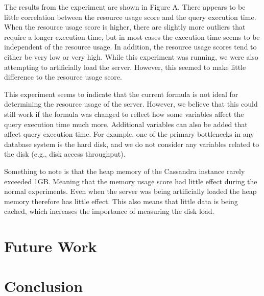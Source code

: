 \documentclass[]{acm_proc_article-sp}
\begin{document}
The results from the experiment are shown in Figure A. There appears to be little correlation between the resource usage score and the query execution time. When the resource usage score is higher, there are slightly more outliers that require a longer execution time, but in most cases the execution time seems to be independent of the resource usage. In addition, the resource usage scores tend to either be very low or very high. While this experiment was running, we were also attempting to artificially load the server. However, this seemed to make little difference to the resource usage score. 

This experiment seems to indicate that the current formula is not ideal for determining the resource usage of the server. However, we believe that this could still work if the formula was changed to reflect how some variables affect the query execution time much more.  Additional variables can also be added that affect query execution time. For example, one of the primary bottlenecks in any database system is the hard disk, and we do not consider any variables related to the disk (e.g., disk access throughput).

Something to note is that the heap memory of the Cassandra instance rarely exceeded 1GB. Meaning that the memory usage score had little effect during the normal experiments. Even when the server was being artificially loaded the heap memory therefore has little effect. This also means that little data is being cached, which increases the importance of measuring the disk load.

\section{Future Work}

\section{Conclusion}



\end{document}
